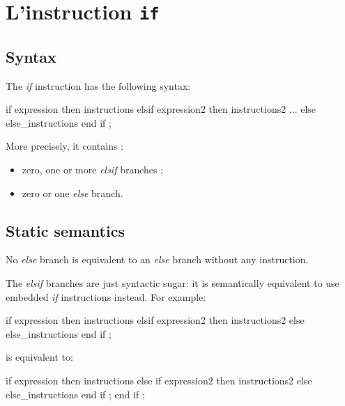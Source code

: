 









\section{L'instruction \texttt{if}}


\subsection{Syntax}

The \emph{if} instruction has the following syntax:
{
\begin{galgascode}
if expression then
  instructions
elsif expression2 then
  instructions2
...
else
  else_instructions
end if ;  
\end{galgascode}
}

More precisely, it contains :
\begin{itemize}
\item zero, one or more \emph{elsif} branches ;
\item zero or one \emph{else} branch.
\end{itemize}


\subsection{Static semantics}


No \emph{else} branch is equivalent to an \emph{else} branch without any instruction.


The \emph{elsif} branches are just syntactic sugar: it is semantically equivalent to use embedded \emph{if} instructions instead. For example:
{
\begin{galgascode}
if expression then
  instructions
elsif expression2 then
  instructions2
else
  else_instructions
end if ;  
\end{galgascode}
}
is equivalent to:
{
\begin{galgascode}
if expression then
  instructions
else
  if expression2 then
    instructions2
  else
    else_instructions
  end if ;  
end if ;  
\end{galgascode}
}

